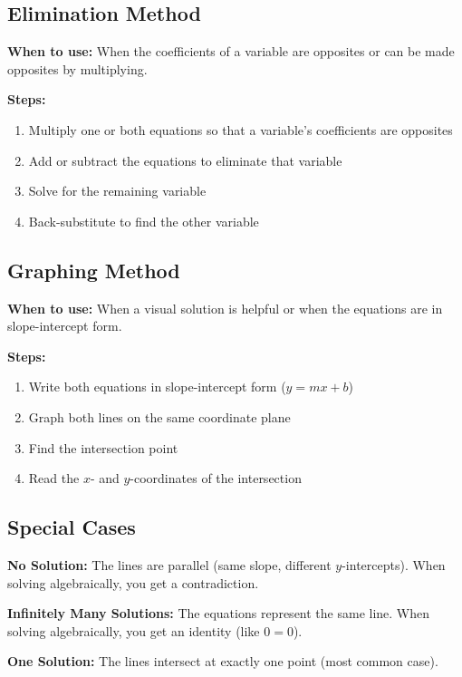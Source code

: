 \documentclass{article}
\begin{document}
\subsection{Elimination Method}

\textbf{When to use:} When the coefficients of a variable are opposites or can be made opposites by multiplying.

\textbf{Steps:}
\begin{enumerate}
    \item Multiply one or both equations so that a variable's coefficients are opposites
    \item Add or subtract the equations to eliminate that variable
    \item Solve for the remaining variable
    \item Back-substitute to find the other variable
\end{enumerate}

\subsection{Graphing Method}

\textbf{When to use:} When a visual solution is helpful or when the equations are in slope-intercept form.

\textbf{Steps:}
\begin{enumerate}
    \item Write both equations in slope-intercept form ($y = mx + b$)
    \item Graph both lines on the same coordinate plane
    \item Find the intersection point
    \item Read the $x$- and $y$-coordinates of the intersection
\end{enumerate}

\subsection{Special Cases}

\textbf{No Solution:} The lines are parallel (same slope, different $y$-intercepts). When solving algebraically, you get a contradiction.

\textbf{Infinitely Many Solutions:} The equations represent the same line. When solving algebraically, you get an identity (like $0 = 0$).

\textbf{One Solution:} The lines intersect at exactly one point (most common case).
\end{document}
